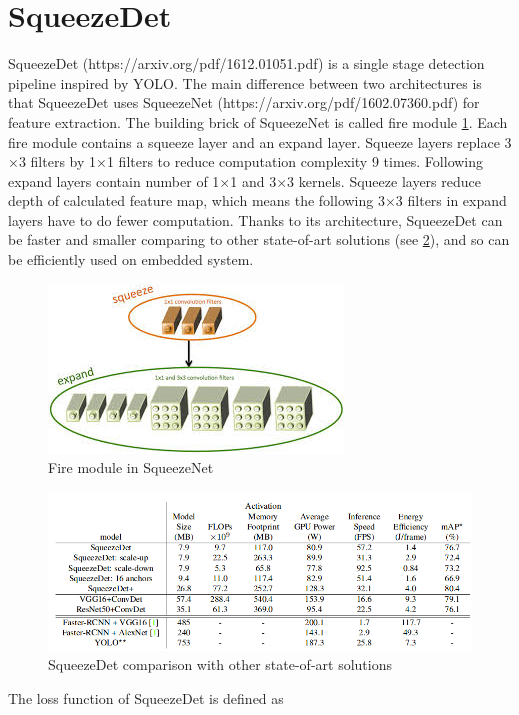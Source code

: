 \documentclass[twoside]{ctuthesis}
\theoremstyle{plain}
\theoremstyle{definition}
\theoremstyle{note}
\begin{document}
\section{SqueezeDet}
SqueezeDet (https://arxiv.org/pdf/1612.01051.pdf) is a single stage detection pipeline inspired by YOLO. The main difference between two architectures is that SqueezeDet uses SqueezeNet (https://arxiv.org/pdf/1602.07360.pdf) for feature extraction.
The building brick of SqueezeNet is called fire module \ref{fire_squeezenet}. Each fire module contains a squeeze layer and an expand layer. Squeeze layers replace 3$\times$3 filters by 1$\times$1 filters to reduce computation complexity 9 times. Following expand layers contain number of 1$\times$1  and 3$\times$3 kernels.    Squeeze layers reduce depth of calculated feature map, which means the following 3$\times$3 filters in expand layers have to do fewer computation. Thanks to its architecture, SqueezeDet can be faster and smaller comparing to other state-of-art solutions (see \ref{squeezedet_comparasion}), and so can be efficiently used on embedded system. 
\begin{figure}[h]
\caption{Fire module in SqueezeNet}
\label{fire_squeezenet}
\includegraphics[width=.5\textwidth]{images/used_networks/fire_squeezenet.jpeg}
\end{figure}
\begin{figure}[h]
\caption{SqueezeDet comparison with other state-of-art solutions}
\label{squeezedet_comparasion}
\includegraphics[width=\textwidth]{images/used_networks/squeezedet_comparation.png}
\end{figure}
The loss function of SqueezeDet is defined as
\end{document}
